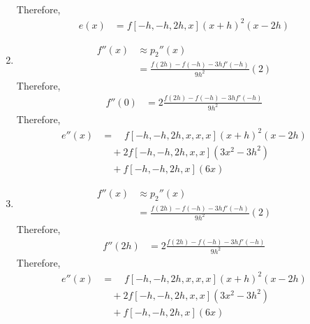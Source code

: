 \documentclass[fleqn, a4paper, 11pt, oneside, reqno]{amsart}
\theoremstyle{definition}
\theoremstyle{theorem}
\begin{document}
\begin{solution}
\begin{enumerate}[leftmargin=*]
\begin{align*}
			\end{align*}
			Therefore,
			\begin{align*}
				e(x) & = f[-h,-h,2 h,x] (x + h)^2 (x - 2 h)
			\end{align*}
		\item
			\begin{align*}
				f''(x) & \approx {p_2}''(x) \\
                                       & = \frac{f(2 h) - f(-h) - 3 h f'(-h)}{9 h^2} (2)
			\end{align*}
			Therefore,
			\begin{align*}
				f''(0) & = 2 \frac{f(2 h) - f(-h) - 3 h f'(-h)}{9 h^2}
			\end{align*}
			Therefore,
			\begin{align*}
				e''(x) & = \quad f[-h,-h,2 h,x,x,x] (x + h)^2 (x - 2 h)          \\
                                       & \quad + 2 f[-h,-h,2 h,x,x] \left( 3 x^2 - 3 h^2 \right) \\
                                       & \quad + f[-h,-h,2 h,x] (6 x)
			\end{align*}
		\item
			\begin{align*}
				f''(x) & \approx {p_2}''(x) \\
                                       & = \frac{f(2 h) - f(-h) - 3 h f'(-h)}{9 h^2} (2)
			\end{align*}
			Therefore,
			\begin{align*}
				f''(2 h) & = 2 \frac{f(2 h) - f(-h) - 3 h f'(-h)}{9 h^2}
			\end{align*}
			Therefore,
			\begin{align*}
				e''(x) & = \quad f[-h,-h,2 h,x,x,x] (x + h)^2 (x - 2 h)          \\
                                       & \quad + 2 f[-h,-h,2 h,x,x] \left( 3 x^2 - 3 h^2 \right) \\
                                       & \quad + f[-h,-h,2 h,x] (6 x)
			\end{align*}
	\end{enumerate}
\end{solution}
\end{document}

